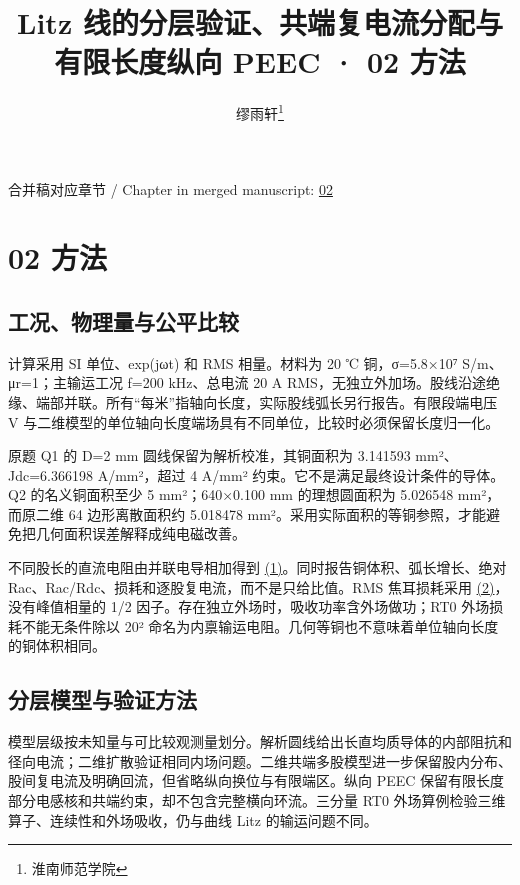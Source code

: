 \documentclass[journal,10pt]{IEEEtran}
\begin{document}
\title{Litz 线的分层验证、共端复电流分配与有限长度纵向 PEEC · 02 方法}
\author{缪雨轩\thanks{淮南师范学院}}

\maketitle
\noindent 合并稿对应章节 / Chapter in merged manuscript: \href{paper_zh-CN_ieee.pdf#chapter-02}{02}\par
\FloatBarrier
\section*{02 方法}
\hypertarget{chapter-02}{}
\subsection*{工况、物理量与公平比较}
\hypertarget{02.conventions.heading}{}
计算采用 SI 单位、exp(jωt) 和 RMS 相量。材料为 20 ℃ 铜，σ=5.8×10⁷ S/m、μr=1；主输运工况 f=200 kHz、总电流 20 A RMS，无独立外加场。股线沿途绝缘、端部并联。所有“每米”指轴向长度，实际股线弧长另行报告。有限段端电压 V 与二维模型的单位轴向长度端场具有不同单位，比较时必须保留长度归一化。


原题 Q1 的 D=2 mm 圆线保留为解析校准，其铜面积为 3.141593 mm²、Jdc=6.366198 A/mm²，超过 4 A/mm² 约束。它不是满足最终设计条件的导体。Q2 的名义铜面积至少 5 mm²；640×0.100 mm 的理想圆面积为 5.026548 mm²，而原二维 64 边形离散面积约 5.018478 mm²。采用实际面积的等铜参照，才能避免把几何面积误差解释成纯电磁改善。


不同股长的直流电阻由并联电导相加得到 \href{paper_zh-CN_ieee.pdf#E01}{(1)}。同时报告铜体积、弧长增长、绝对 Rac、Rac/Rdc、损耗和逐股复电流，而不是只给比值。RMS 焦耳损耗采用 \href{paper_zh-CN_ieee.pdf#E02}{(2)}，没有峰值相量的 1/2 因子。存在独立外场时，吸收功率含外场做功；RT0 外场损耗不能无条件除以 20² 命名为内禀输运电阻。几何等铜也不意味着单位轴向长度的铜体积相同。


\subsection*{分层模型与验证方法}
\hypertarget{02.hierarchy.heading}{}
模型层级按未知量与可比较观测量划分。解析圆线给出长直均质导体的内部阻抗和径向电流；二维扩散验证相同内场问题。二维共端多股模型进一步保留股内分布、股间复电流及明确回流，但省略纵向换位与有限端区。纵向 PEEC 保留有限长度部分电感核和共端约束，却不包含完整横向环流。三分量 RT0 外场算例检验三维算子、连续性和外场吸收，仍与曲线 Litz 的输运问题不同。
\end{document}
